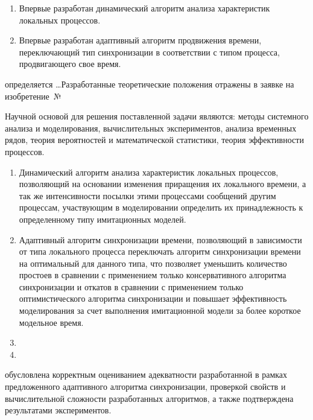 {\novelty}
\begin{enumerate}
  \item Впервые разработан динамический алгоритм анализа характеристик локальных процессов.
  \item Впервые разработан адаптивный алгоритм продвижения времени, переключающий тип синхронизации в соответствии с типом процесса, продвигающего свое время.
\end{enumerate}

{\influence} определяется \ldots Разработанные теоретические положения отражены в заявке на изобретение~№

{\methods} Научной основой для решения поставленной
задачи являются: методы системного анализа и моделирования, вычислительных экспериментов, анализа временных рядов, теория вероятностей и математической статистики, теория эффективности  процессов.

{}
\begin{enumerate}
  \item Динамический алгоритм анализа характеристик локальных процессов, позволяющий на основании изменения приращения их локального времени, а так же интенсивности посылки этими процессами сообщений другим процессам, участвующим в моделировании определить их принадлежность к определенному типу имитационных моделей.
  \item Адаптивный алгоритм синхронизации времени, позволяющий в зависимости от типа локального процесса переключать алгоритм синхронизации времени на оптимальный для данного типа, что позволяет уменьшить количество простоев в сравнении с применением только консервативного алгоритма синхронизации и откатов в сравнении с применением только оптимистического алгоритма синхронизации и повышает эффективность моделирования за счет выполнения имитационной модели за более короткое модельное время.
  \item {}
  \item {}
\end{enumerate}


{\reliability} обусловлена корректным оцениванием адекватности разработанной в рамках предложенного адаптивного алгоритма синхронизации, проверкой
свойств и вычислительной сложности разработанных алгоритмов, а также подтверждена результатами экспериментов.


